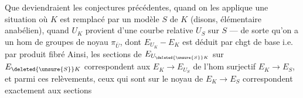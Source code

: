 Que deviendraient les conjectures précédentes, quand on les applique  une situation où $K$ est remplacé par un modèle $S$ de $K$ (disons, élémentaire anabélien), quand $U_K$ provient d'une courbe relative $U_S$ sur $S$ — de sorte qu'on a un hom de groupes
de noyau $\pi_{\bar U}$, dont $E_{U_K}-E_K$ est déduit par chgt de base i.e. par produit fibré
Ainsi, les sections de $E_{U_{\deleted{\unsure{S}}K}}$ sur $E_{\deleted{\unsure{S}}K}$ correspondent aux   $E_K\longrightarrow E_{U_S}$ de l'hom surjectif $E_K\longrightarrow E_S$, et parmi ces relèvements, ceux qui sont   sur le noyau de $E_K\longrightarrow E_S$ correspondent exactement aux sections

